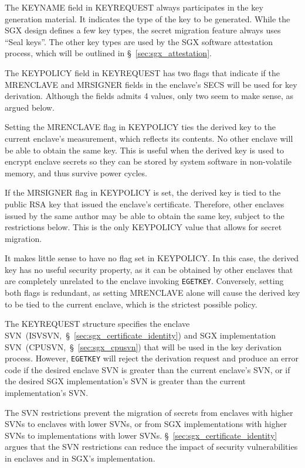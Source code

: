 The KEYNAME field in KEYREQUEST always participates in the key generation
material. It indicates the type of the key to be generated. While the SGX
design defines a few key types, the secret migration feature always uses ``Seal
keys''. The other key types are used by the SGX software attestation process,
which will be outlined in \S~\ref{sec:sgx_attestation}.

The KEYPOLICY field in KEYREQUEST has two flags that indicate if the MRENCLAVE
and MRSIGNER fields in the enclave's SECS will be used for key derivation.
Although the fields admits 4 values, only two seem to make sense, as argued
below.

Setting the MRENCLAVE flag in KEYPOLICY ties the derived key to the current
enclave's measurement, which reflects its contents. No other enclave will be
able to obtain the same key. This is useful when the derived key is used to
encrypt enclave secrets so they can be stored by system software in
non-volatile memory, and thus survive power cycles.

If the MRSIGNER flag in KEYPOLICY is set, the derived key is tied to the public
RSA key that issued the enclave's certificate. Therefore, other enclaves issued
by the same author may be able to obtain the same key, subject to the
restrictions below. This is the only KEYPOLICY value that allows for secret
migration.

It makes little sense to have no flag set in KEYPOLICY. In this case, the
derived key has no useful security property, as it can be obtained by other
enclaves that are completely unrelated to the enclave invoking
\texttt{EGETKEY}. Conversely, setting both flags is redundant, as setting
MRENCLAVE alone will cause the derived key to be tied to the current enclave,
which is the strictest possible policy.

The KEYREQUEST structure specifies the enclave
SVN~(ISVSVN,~\S~\ref{sec:sgx_certificate_identity}) and SGX implementation
SVN~(CPUSVN,~\S~\ref{sec:sgx_cpusvn}) that will be used in the key derivation
process. However, \texttt{EGETKEY} will reject the derivation request and
produce an error code if the desired enclave SVN is greater than the current
enclave's SVN, or if the desired SGX implementation's SVN is greater than the
current implementation's SVN.

The SVN restrictions prevent the migration of secrets from enclaves with higher
SVNs to enclaves with lower SVNs, or from SGX implementations with higher SVNs
to implementations with lower SVNs. \S~\ref{sec:sgx_certificate_identity}
argues that the SVN restrictions can reduce the impact of security
vulnerabilities in enclaves and in SGX's implementation.

